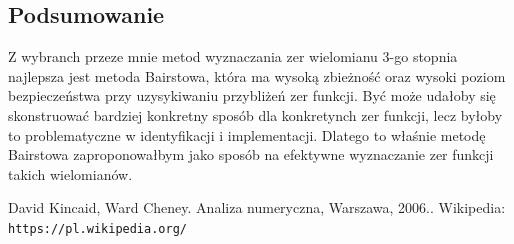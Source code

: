 \documentclass[a4paper]{article}
\begin{document}
    \subsection{Podsumowanie}
        Z wybranch przeze mnie metod wyznaczania zer wielomianu 3-go stopnia najlepsza jest metoda Bairstowa, która
        ma wysoką zbieżność oraz wysoki poziom bezpieczeństwa przy uzysykiwaniu przybliżeń zer funkcji. 
        Być może udałoby się skonstruować bardziej konkretny sposób dla konkretynch zer funkcji, lecz byłoby to problematyczne
        w identyfikacji i implementacji. Dlatego to właśnie metodę Bairstowa zaproponowałbym jako sposób na 
        efektywne wyznaczanie zer funkcji takich wielomianów.
        
\begin{thebibliography}{9}
    David Kincaid, Ward Cheney. 
    Analiza numeryczna, Warszawa, 2006..
    Wikipedia:
    \texttt{https://pl.wikipedia.org/}
\end{thebibliography} 
\end{document}
